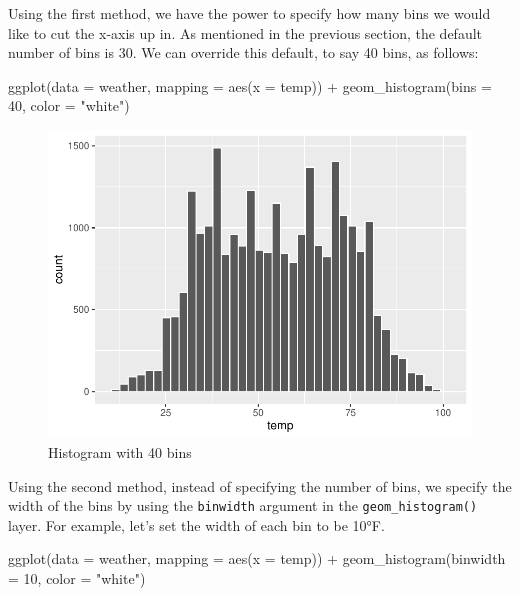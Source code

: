 \documentclass[
  letterpaper,
  DIV=11,
  numbers=noendperiod]{scrreprt}
\newenvironment{Shaded}{\begin{snugshade}}{\end{snugshade}}
\newcommand{\AttributeTok}[1]{\textcolor[rgb]{0.40,0.45,0.13}{#1}}
\newcommand{\DecValTok}[1]{\textcolor[rgb]{0.68,0.00,0.00}{#1}}
\newcommand{\FunctionTok}[1]{\textcolor[rgb]{0.28,0.35,0.67}{#1}}
\newcommand{\NormalTok}[1]{\textcolor[rgb]{0.00,0.23,0.31}{#1}}
\newcommand{\SpecialCharTok}[1]{\textcolor[rgb]{0.37,0.37,0.37}{#1}}
\newcommand{\StringTok}[1]{\textcolor[rgb]{0.13,0.47,0.30}{#1}}
\theoremstyle{definition}
\theoremstyle{remark}
\begin{document}
Using the first method, we have the power to specify how many bins we
would like to cut the x-axis up in. As mentioned in the previous
section, the default number of bins is 30. We can override this default,
to say 40 bins, as follows:

\begin{Shaded}
\begin{Highlighting}[]
\FunctionTok{ggplot}\NormalTok{(}\AttributeTok{data =}\NormalTok{ weather, }\AttributeTok{mapping =} \FunctionTok{aes}\NormalTok{(}\AttributeTok{x =}\NormalTok{ temp)) }\SpecialCharTok{+}
  \FunctionTok{geom\_histogram}\NormalTok{(}\AttributeTok{bins =} \DecValTok{40}\NormalTok{, }\AttributeTok{color =} \StringTok{"white"}\NormalTok{)}
\end{Highlighting}
\end{Shaded}

\begin{figure}[H]

{\centering \includegraphics{02-visualization_files/figure-pdf/fig-hist-bins40-1.pdf}

}

\caption{\label{fig-hist-bins40}Histogram with 40 bins}

\end{figure}

Using the second method, instead of specifying the number of bins, we
specify the width of the bins by using the \texttt{binwidth} argument in
the \texttt{geom\_histogram()} layer. For example, let's set the width
of each bin to be 10°F.

\begin{Shaded}
\begin{Highlighting}[]
\FunctionTok{ggplot}\NormalTok{(}\AttributeTok{data =}\NormalTok{ weather, }\AttributeTok{mapping =} \FunctionTok{aes}\NormalTok{(}\AttributeTok{x =}\NormalTok{ temp)) }\SpecialCharTok{+}
  \FunctionTok{geom\_histogram}\NormalTok{(}\AttributeTok{binwidth =} \DecValTok{10}\NormalTok{, }\AttributeTok{color =} \StringTok{"white"}\NormalTok{)}
\end{Highlighting}
\end{Shaded}
\end{document}
